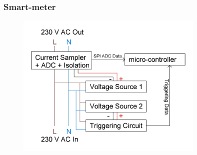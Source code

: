 \documentclass{beamer}
\begin{document}


	\begin{frame}\frametitle{Smart-meter}
		
		\begin{figure}
			\centering
			\includegraphics[width=0.8\textwidth]{../chapters/hardware-chapters/AC/ac-current-sampler/ac-current-sampler-architectural.JPG}
		\end{figure}

	\end{frame}
	
\end{document}
